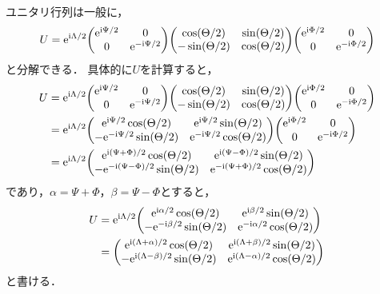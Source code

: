 \documentclass{report}
\begin{document}
  ユニタリ行列は一般に，
  \begin{align}
    U = \e^{\i\Lambda/2}
    \mqty(
      \e^{\i\Psi/2} & 0 \\ 
      0 & \e^{-\i\Psi/2}
    )
    \mqty(
      \cos(\Theta / 2) & \sin(\Theta / 2) \\ 
      -\sin(\Theta / 2) & \cos(\Theta / 2)
    )\mqty(
      \e^{\i\Phi/2} & 0 \\ 
      0 & \e^{-\i\Phi/2}
    )
  \end{align}
  と分解できる．
  具体的に$U$を計算すると，
  \begin{align}
    U &= \e^{\i\Lambda/2}
    \mqty(
      \e^{\i\Psi/2} & 0 \\ 
      0 & \e^{-\i\Psi/2}
    )
    \mqty(
      \cos(\Theta / 2) & \sin(\Theta / 2) \\ 
      -\sin(\Theta / 2) & \cos(\Theta / 2)
    )\mqty(
      \e^{\i\Phi/2} & 0 \\ 
      0 & \e^{-\i\Phi/2}
    ) \\ 
    &= \e^{\i\Lambda/2}\mqty(
      \e^{\i\Psi/2}\cos(\Theta / 2) & \e^{\i\Psi/2}\sin(\Theta / 2) \\ 
      -\e^{-\i\Psi/2}\sin(\Theta / 2) & \e^{-\i\Psi/2}\cos(\Theta / 2)
    )\mqty(
      \e^{\i\Phi/2} & 0 \\ 
      0 & \e^{-\i\Phi/2}
    ) \\ 
    &= \e^{\i\Lambda/2}\mqty(
      \e^{\i(\Psi + \Phi) / 2}\cos(\Theta / 2) & \e^{\i(\Psi - \Phi) / 2}\sin(\Theta / 2) \\ 
      -\e^{-\i(\Psi - \Phi) / 2}\sin(\Theta / 2) & \e^{-\i(\Psi + \Phi) / 2}\cos(\Theta / 2)
    )\label{unitary-representation}
  \end{align} 
  であり，$\alpha = \Psi + \Phi$，$\beta = \Psi - \Phi$とすると，
  \begin{align}
    U &= \e^{\i\Lambda/2}\mqty(
      \e^{\i\alpha / 2}\cos(\Theta / 2) & \e^{\i\beta / 2}\sin(\Theta / 2) \\ 
      -\e^{-\i\beta / 2}\sin(\Theta / 2) & \e^{-\i\alpha / 2}\cos(\Theta / 2)
    ) \\ 
    &= \mqty(
      \e^{\i(\Lambda + \alpha) / 2}\cos(\Theta / 2) & \e^{\i(\Lambda + \beta) / 2}\sin(\Theta / 2) \\ 
      -\e^{\i(\Lambda - \beta) / 2}\sin(\Theta / 2) & \e^{\i(\Lambda - \alpha) / 2}\cos(\Theta / 2)
    ) 
  \end{align}
  と書ける．
\end{document}
